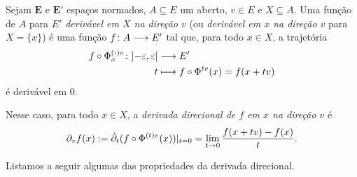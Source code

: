 \begin{definition}
Sejam $\bm E$ e $\bm E'$ espaços normados, $A \subseteq E$ um aberto, $v \in E$ e $X \subseteq A$. Uma função de $A$ para $E'$ \emph{derivável em $X$ na direção $v$} (ou \emph{derivável em $x$ na direção $v$} para $X=\{x\}$) é uma função ${f}\colon {A} \longrightarrow {E'}$ tal que, para todo $x \in X$, a trajetória
	\begin{align*}
	{f \circ {\Phi}^{{(\bm{\cdot})}{v}}_{x}}\colon {\left]{-\varepsilon},{\varepsilon}\right[} &\longrightarrow {E'} \\{t} &\longmapsto f \circ {\Phi}^{{t}{v}}(x) = f(x+tv)
	\end{align*}
é derivável em $0$.

Nesse caso, para todo $x \in X$, a \emph{derivada direcional de $f$ em $x$ na direção $v$} é
	\begin{equation*}
	\partial_{v} f(x) := \dot{\partial}_{t}( f \circ {\Phi}^{{(t)}{v}}(x))|_{t=0} = \lim_{t \to 0} \frac{f(x+tv)-f(x)}{t}.
	\end{equation*}
\end{definition}

Listamos a seguir algumas das propriedades da derivada direcional.

